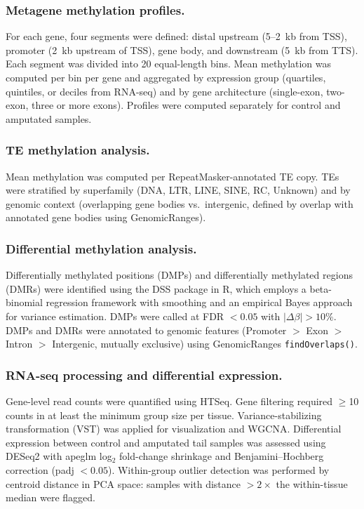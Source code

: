 \documentclass[12pt]{article}
\begin{document}
\subsubsection*{Metagene methylation profiles.}
For each gene, four segments were defined: distal upstream (5--2~kb from TSS), promoter (2~kb upstream of TSS), gene body, and downstream (5~kb from TTS). Each segment was divided into 20 equal-length bins. Mean methylation was computed per bin per gene and aggregated by expression group (quartiles, quintiles, or deciles from RNA-seq) and by gene architecture (single-exon, two-exon, three or more exons). Profiles were computed separately for control and amputated samples.

\subsubsection*{TE methylation analysis.}
Mean methylation was computed per RepeatMasker-annotated TE copy. TEs were stratified by superfamily (DNA, LTR, LINE, SINE, RC, Unknown) and by genomic context (overlapping gene bodies vs.\ intergenic, defined by overlap with annotated gene bodies using GenomicRanges).

\subsubsection*{Differential methylation analysis.}
Differentially methylated positions (DMPs) and differentially methylated regions (DMRs) were identified using the DSS package in R, which employs a beta-binomial regression framework with smoothing and an empirical Bayes approach for variance estimation. DMPs were called at FDR $< 0.05$ with $|\Delta\beta| > 10\%$. DMPs and DMRs were annotated to genomic features (Promoter $>$ Exon $>$ Intron $>$ Intergenic, mutually exclusive) using GenomicRanges \texttt{findOverlaps()}.

\subsubsection*{RNA-seq processing and differential expression.}
Gene-level read counts were quantified using HTSeq. Gene filtering required $\geq$10 counts in at least the minimum group size per tissue. Variance-stabilizing transformation (VST) was applied for visualization and WGCNA. Differential expression between control and amputated tail samples was assessed using DESeq2 with apeglm log$_2$ fold-change shrinkage and Benjamini--Hochberg correction (padj $< 0.05$). Within-group outlier detection was performed by centroid distance in PCA space: samples with distance $> 2\times$ the within-tissue median were flagged.
\end{document}
